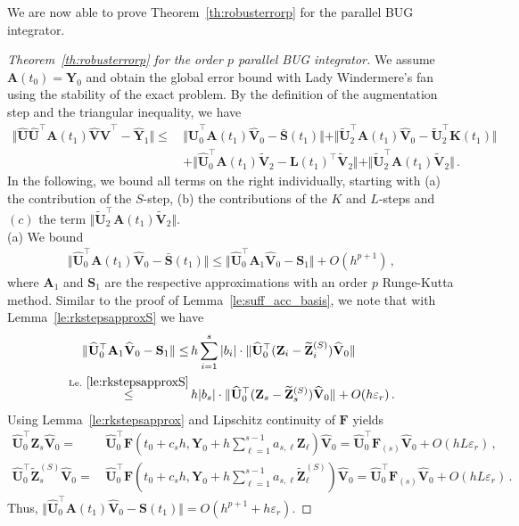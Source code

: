 \documentclass[preprint,runningheads]{svjour3}
\def\wh{\widehat}
\newcommand\bfA{{\mathbf A}}
\newcommand\bfF{{\mathbf F}}
\newcommand\bfK{{\mathbf K}}
\newcommand\bfL{{\mathbf L}}
\newcommand\bfS{{\mathbf S}}
\newcommand\bfU{{\mathbf U}}
\newcommand\bfV{{\mathbf V}}
\newcommand\bfY{{\mathbf Y}}
\newcommand\bfZ{{\mathbf Z}}
\begin{document}
We are now able to prove Theorem~\ref{th:robusterrorp} for the parallel BUG integrator.
\begin{proof}[Theorem~\ref{th:robusterrorp} for the order $p$ parallel BUG integrator]
We assume $\bfA(t_0) = \bfY_0$ and obtain the global error bound with Lady Windermere's fan using the stability of the exact problem. 
    By the definition of the augmentation step and the triangular inequality, we have
\begin{align*}
    \Vert \widehat \bfU\widehat{\bfU}^{\top}\bfA(t_1)\widehat \bfV\widehat{\bfV}^{\top} -\wh\bfY_1 \Vert \leq\,& \Vert \widehat{\bfU}_0^{\top}\bfA(t_1)\widehat \bfV_0 - \bar \bfS(t_1) \Vert + \Vert \widetilde{\bfU}_2^{\top}\bfA(t_1)\widehat \bfV_0 - \widetilde{\bfU}_2^{\top}\bfK(t_1) \Vert \\
    \,&+ \Vert \widehat \bfU_0^{\top}\bfA(t_1)\widetilde{\bfV}_2 - \bfL(t_1)^{\top}\widetilde{\bfV}_2 \Vert + \Vert \widetilde{\bfU}_2^{\top}\bfA(t_1)\widetilde{\bfV}_2\Vert\,.
\end{align*}
In the following, we bound all terms on the right individually, starting with (a) the contribution of the $S$-step, (b) the contributions of the $K$ and $L$-steps and $(c)$ the term $\Vert \widetilde{\bfU}_2^{\top}\bfA(t_1)\widetilde{\bfV}_2\Vert$.\\
(a) We bound
\begin{align*}
    \Vert \wh\bfU_0^{\top}\bfA(t_1)\wh\bfV_0 - \bar\bfS(t_1) \Vert \leq \Vert \wh\bfU_0^{\top}\bfA_1\wh\bfV_0 - \bfS_1 \Vert + O(h^{p+1})\,,
\end{align*}
where $\bfA_1$ and $\bfS_1$ are the respective approximations with an order $p$ Runge-Kutta method. Similar to the proof of Lemma~\ref{le:suff_acc_basis}, we note that with Lemma~\ref{le:rkstepsapproxS} we have
\begin{align*}
    \Vert \wh\bfU_0^{\top}\bfA_1\wh\bfV_0 - \bfS_1 \Vert \leq\,& h\sum_{i=1}^s |b_i| \cdot \Vert \wh\bfU_0^{\top}(\bfZ_i - \widetilde \bfZ_i^{(S)})\wh\bfV_0 \Vert \\
    \stackrel{\mathrm{Le.~\ref{le:rkstepsapproxS}}}{\leq}\,& h |b_s| \cdot \Vert \wh\bfU_0^{\top}(\bfZ_s - \widetilde \bfZ_s^{(S)})\wh\bfV_0 \Vert +O(h\varepsilon_r)\,.
\end{align*}
Using Lemma~\ref{le:rkstepsapprox} and Lipschitz continuity of $\bfF$ yields
\begin{align*}
    \wh \bfU_0^{\top}\bfZ_s\wh \bfV_0 =\,& \wh \bfU_0^{\top}\bfF(t_0 + c_s h, \bfY_0 + h\sum_{\ell = 1}^{s-1}a_{s,\ell} \bfZ_{\ell})\wh \bfV_0 = \wh \bfU_0^{\top}\bfF_{(s)}\wh \bfV_0 + O(hL\varepsilon_r)\,,\\
    \wh \bfU_0^{\top}\widetilde \bfZ_s^{(S)}\wh \bfV_0 =\,& \wh \bfU_0^{\top}\bfF(t_0 + c_s h, \bfY_0 + h\sum_{\ell = 1}^{s-1}a_{s,\ell} \widetilde \bfZ_{\ell}^{(S)})\wh \bfV_0 = \wh \bfU_0^{\top}\bfF_{(s)}\wh \bfV_0 + O(hL\varepsilon_r)\,.
\end{align*}
Thus, $\Vert \wh\bfU_0^{\top}\bfA(t_1)\wh\bfV_0 - \bfS(t_1) \Vert = O(h^{p+1} + h\varepsilon_r)$.


\end{proof}
\end{document}
